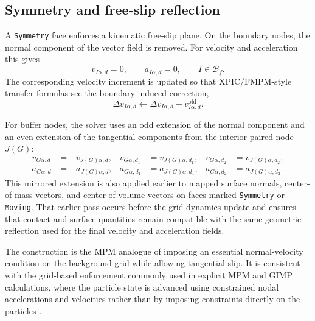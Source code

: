 \subsection{Symmetry and free-slip reflection}
\label{subsec:bc-symmetry}

A \texttt{Symmetry} face enforces a kinematic free-slip plane.  On the boundary nodes, the normal component of the vector field is removed.  For velocity and acceleration this gives
\begin{equation}
  v_{I\alpha,d}=0,
  \qquad
  a_{I\alpha,d}=0,
  \qquad I\in\mathcal{B}_f.
  \label{eq:bc-symmetry-boundary-node}
\end{equation}
The corresponding velocity increment is updated so that XPIC/FMPM-style transfer formulas see the boundary-induced correction,
\begin{equation}
  \Delta v_{I\alpha,d} \leftarrow \Delta v_{I\alpha,d} - v_{I\alpha,d}^{\mathrm{old}}.
\end{equation}

For buffer nodes, the solver uses an odd extension of the normal component and an even extension of the tangential components from the interior paired node $J(G)$:
\begin{align}
  v_{G\alpha,d}   &= -v_{J(G)\alpha,d}, &
  v_{G\alpha,d_1} &=  v_{J(G)\alpha,d_1}, &
  v_{G\alpha,d_2} &=  v_{J(G)\alpha,d_2},
  \label{eq:bc-symmetry-buffer-velocity} \\
  a_{G\alpha,d}   &= -a_{J(G)\alpha,d}, &
  a_{G\alpha,d_1} &=  a_{J(G)\alpha,d_1}, &
  a_{G\alpha,d_2} &=  a_{J(G)\alpha,d_2}.
\end{align}
This mirrored extension is also applied earlier to mapped surface normals, center-of-mass vectors, and center-of-volume vectors on faces marked \texttt{Symmetry} or \texttt{Moving}.  That earlier pass occurs before the grid dynamics update and ensures that contact and surface quantities remain compatible with the same geometric reflection used for the final velocity and acceleration fields.

The construction is the MPM analogue of imposing an essential normal-velocity condition on the background grid while allowing tangential slip.  It is consistent with the grid-based enforcement commonly used in explicit MPM and GIMP calculations, where the particle state is advanced using constrained nodal accelerations and velocities rather than by imposing constraints directly on the particles \cite{sulsky1994history,bardenhagen2004gimp,wallstedt2008explicit}.

